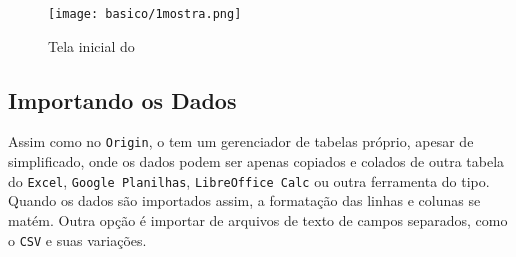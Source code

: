 \begin{figure}[H]
    \centering
    \texttt{[image: basico/1mostra.png]}

    \caption{Tela inicial do \software}
    \label{fig:basico:mostragem}
\end{figure}








\subsection{Importando os Dados} \label{sec:basico:import}

    Assim como no \texttt{Origin}, o \software tem um gerenciador de tabelas próprio, apesar de simplificado, onde os dados podem ser apenas copiados e colados de outra tabela do \texttt{Excel}, \texttt{Google Planilhas}, \texttt{LibreOffice Calc} ou outra ferramenta do tipo. Quando os dados são importados assim, a formatação das linhas e colunas se matém. Outra opção é importar de arquivos de texto de campos separados, como o \texttt{CSV} e suas variações.

